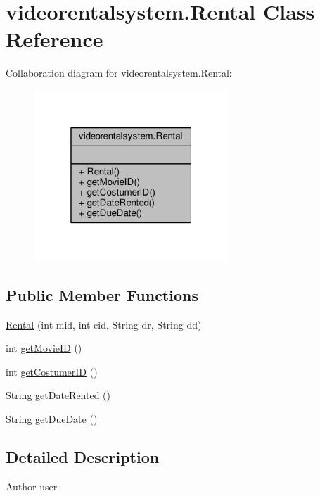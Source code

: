 \hypertarget{classvideorentalsystem_1_1Rental}{\section{videorentalsystem.\-Rental Class Reference}
\label{classvideorentalsystem_1_1Rental}
}


Collaboration diagram for videorentalsystem.\-Rental\-:
\nopagebreak
\begin{figure}[H]
\begin{center}
\leavevmode
\includegraphics[width=208pt]{classvideorentalsystem_1_1Rental__coll__graph}
\end{center}
\end{figure}
\subsection*{Public Member Functions}
\begin{DoxyCompactItemize}
\item 
\hyperlink{classvideorentalsystem_1_1Rental_af7a54279ae3d0f23c4bf153697328dc1}{Rental} (int mid, int cid, String dr, String dd)
\item 
int \hyperlink{classvideorentalsystem_1_1Rental_a5193f532b28c06ad36988e0704e8a57d}{get\-Movie\-I\-D} ()
\item 
int \hyperlink{classvideorentalsystem_1_1Rental_ac14f266fe0f4b36785b9cf0e9c47b4d8}{get\-Costumer\-I\-D} ()
\item 
String \hyperlink{classvideorentalsystem_1_1Rental_a44ad71775fe6496742da543e3129aebb}{get\-Date\-Rented} ()
\item 
String \hyperlink{classvideorentalsystem_1_1Rental_a3ed76e0212907fa402a58f9b983db82e}{get\-Due\-Date} ()
\end{DoxyCompactItemize}


\subsection{Detailed Description}
\begin{DoxyAuthor}{Author}
user 
\end{DoxyAuthor}



